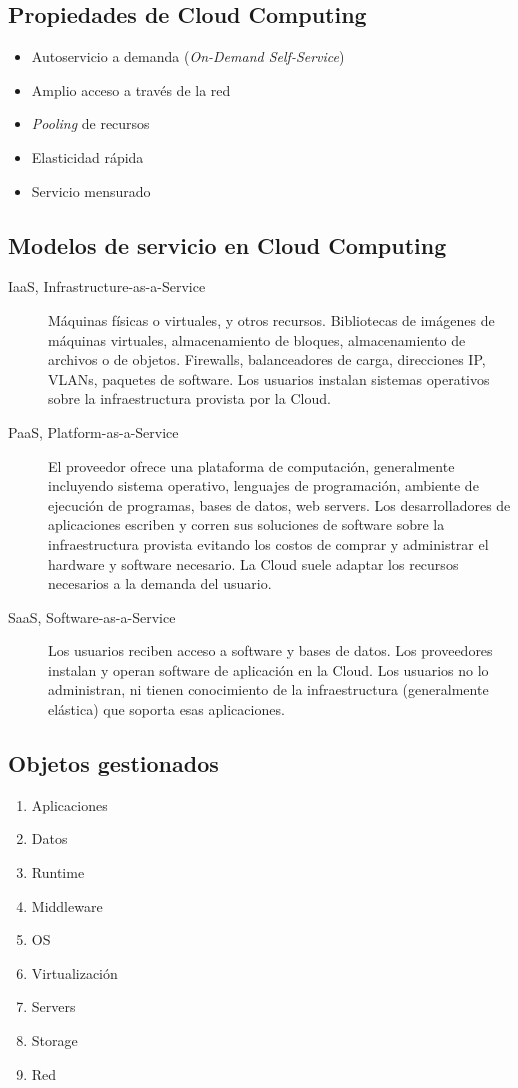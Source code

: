 
\subsection{Propiedades de Cloud Computing}
\begin{itemize}
	\item Autoservicio a demanda (\textit{On-Demand Self-Service})
	\item Amplio acceso a través de la red 
	\item \textit{Pooling} de recursos
	\item Elasticidad rápida
	\item Servicio mensurado
\end{itemize}

\subsection{Modelos de servicio en Cloud Computing}
\begin{description}
	\item[IaaS, Infrastructure-as-a-Service] Máquinas físicas o virtuales, y otros recursos. Bibliotecas de imágenes de máquinas virtuales, almacenamiento de bloques, almacenamiento de archivos o de objetos. Firewalls, balanceadores de carga, direcciones IP, VLANs, paquetes de software. Los usuarios instalan sistemas operativos sobre la infraestructura provista por la Cloud. 
	\item[PaaS, Platform-as-a-Service] El proveedor ofrece una plataforma de computación, generalmente incluyendo sistema operativo, lenguajes de programación, ambiente de ejecución de programas, bases de datos, web servers. Los desarrolladores de aplicaciones escriben y corren sus soluciones de software sobre la infraestructura provista evitando los costos de comprar y administrar el hardware y software necesario. La Cloud suele adaptar los recursos necesarios a la demanda del usuario. 
	\item[SaaS, Software-as-a-Service] Los usuarios reciben acceso a software y bases de datos. Los proveedores instalan y operan software de aplicación en la Cloud. Los usuarios no lo administran, ni tienen conocimiento de la infraestructura (generalmente elástica) que soporta esas aplicaciones.
\end{description}

\subsection{Objetos gestionados}
\begin{enumerate}
	\item Aplicaciones
	\item Datos
	\item Runtime
	\item Middleware
	\item OS
 	\item Virtualización
 	\item Servers
 	\item Storage
	\item Red
\end{enumerate}

